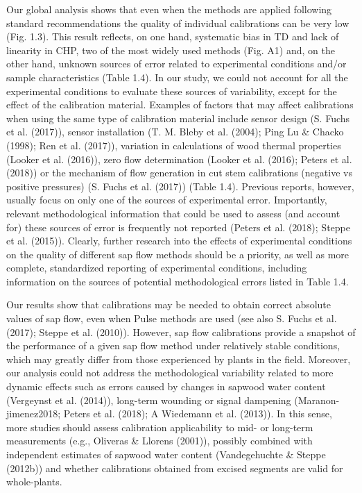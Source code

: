 \documentclass[11pt,twoside]{reedthesis}
\begin{document}
Our global analysis shows that even when the methods are applied
following standard recommendations the quality of individual
calibrations can be very low (Fig. 1.3). This result reflects, on one
hand, systematic bias in TD and lack of linearity in CHP, two of the
most widely used methods (Fig. A1) and, on the other hand, unknown
sources of error related to experimental conditions and/or sample
characteristics (Table 1.4). In our study, we could not account for all
the experimental conditions to evaluate these sources of variability,
except for the effect of the calibration material. Examples of factors
that may affect calibrations when using the same type of calibration
material include sensor design (S. Fuchs et al. (2017)), sensor
installation (T. M. Bleby et al. (2004); Ping Lu \& Chacko (1998); Ren
et al. (2017)), variation in calculations of wood thermal properties
(Looker et al. (2016)), zero flow determination (Looker et al. (2016);
Peters et al. (2018)) or the mechanism of flow generation in cut stem
calibrations (negative vs positive pressures) (S. Fuchs et al. (2017))
(Table 1.4). Previous reports, however, usually focus on only one of the
sources of experimental error. Importantly, relevant methodological
information that could be used to assess (and account for) these sources
of error is frequently not reported (Peters et al. (2018); Steppe et al.
(2015)). Clearly, further research into the effects of experimental
conditions on the quality of different sap flow methods should be a
priority, as well as more complete, standardized reporting of
experimental conditions, including information on the sources of
potential methodological errors listed in Table 1.4.\par

Our results show that calibrations may be needed to obtain correct
absolute values of sap flow, even when Pulse methods are used (see also
S. Fuchs et al. (2017); Steppe et al. (2010)). However, sap flow
calibrations provide a snapshot of the performance of a given sap flow
method under relatively stable conditions, which may greatly differ from
those experienced by plants in the field. Moreover, our analysis could
not address the methodological variability related to more dynamic
effects such as errors caused by changes in sapwood water content
(Vergeynst et al. (2014)), long-term wounding or signal dampening
(Maranon-jimenez2018; Peters et al. (2018); A Wiedemann et al. (2013)).
In this sense, more studies should assess calibration applicability to
mid- or long-term measurements (e.g., Oliveras \& Llorens (2001)),
possibly combined with independent estimates of sapwood water content
(Vandegehuchte \& Steppe (2012b)) and whether calibrations obtained from
excised segments are valid for whole-plants.\par
\end{document}
